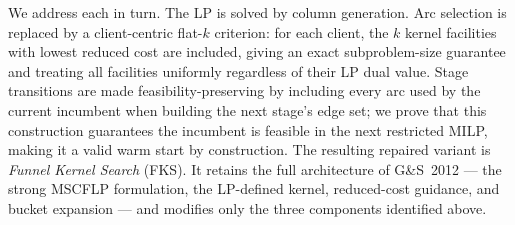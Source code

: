We address each in turn.
The LP is solved by column generation.
Arc selection is replaced by a client-centric flat-$k$ criterion: for each
client, the $k$ kernel facilities with lowest reduced cost are included,
giving an exact subproblem-size guarantee and treating all facilities uniformly
regardless of their LP dual value.
Stage transitions are made feasibility-preserving by including every arc used by
the current incumbent when building the next stage's edge set; we prove that
this construction guarantees the incumbent is feasible in the next restricted
MILP, making it a valid warm start by construction.
The resulting repaired variant is \emph{Funnel Kernel Search} (FKS).
It retains the full architecture of G\&S~2012 --- the strong MSCFLP formulation,
the LP-defined kernel, reduced-cost guidance, and bucket expansion --- and
modifies only the three components identified above.

